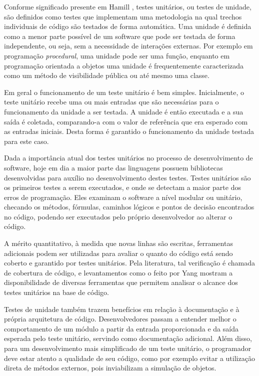 Conforme significado presente em Hamill \cite{hamill}, testes unitários, ou testes de unidade, são definidos como testes que implementam uma metodologia na qual trechos individuais de código são testados de forma automática. Uma unidade é definida como a menor parte possível de um software que pode ser testada de forma independente, ou seja, sem a necessidade de interações externas. Por exemplo em programação \emph{procedural}, uma unidade pode ser uma função, enquanto em programação orientada a objetos uma unidade é frequentemente caracterizada como um método de visibilidade pública ou até mesmo uma classe.

Em geral o funcionamento de um teste unitário é bem simples. Inicialmente, o teste unitário recebe uma ou mais entradas que são necessárias para o funcionamento da unidade a ser testada. A unidade é então executada e a sua saída é coletada, comparando-a com o valor de referência que era esperado com as entradas iniciais. Desta forma é garantido o funcionamento da unidade testada para este caso.

Dada a importância atual dos testes unitários no processo de desenvolvimento de software, hoje em dia a maior parte das linguagens possuem bibliotecas desenvolvidas para auxílio no desenvolvimento destes testes. Testes unitários são os primeiros testes a serem executados, e onde se detectam a maior parte dos erros de programação. Eles examinam o software a nível modular ou unitário, checando os métodos, fórmulas, caminhos lógicos e pontos de decisão encontrados no código, podendo ser executados pelo próprio desenvolvedor ao alterar o código.

A mérito quantitativo, à medida que novas linhas são escritas, ferramentas adicionais podem ser utilizadas para avaliar o quanto do código está sendo coberto e garantido por testes unitários. Pela literatura, tal verificação é chamada de cobertura de código, e levantamentos como o feito por Yang \cite{yang} mostram a disponibilidade de diversas ferramentas que permitem analisar o alcance dos testes unitários na base de código.

Testes de unidade também trazem benefícios em relação à documentação e à própria arquitetura de código. Desenvolvedores passam a entender melhor o comportamento de um módulo a partir da entrada proporcionada e da saída esperada pelo teste unitário, servindo como documentação adicional. Além disso, para um desenvolvimento mais simplificado de um teste unitário, o programador deve estar atento a qualidade de seu código, como por exemplo evitar a utilização direta de métodos externos, pois inviabilizam a simulação de objetos.
